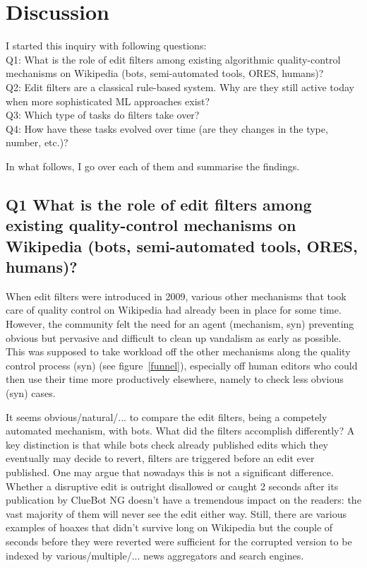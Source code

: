 \chapter{Discussion}
\label{chap:discussion}

I started this inquiry with following questions:\\ %
Q1: What is the role of edit filters among existing algorithmic quality-control mechanisms on Wikipedia (bots, semi-automated tools, ORES, humans)?\\
Q2: Edit filters are a classical rule-based system. Why are they still active today when more sophisticated ML approaches exist?\\
Q3: Which type of tasks do filters take over?\\ %
Q4: How have these tasks evolved over time (are they changes in the type, number, etc.)? %

In what follows, I go over each of them and summarise the findings.

\section{Q1 What is the role of edit filters among existing quality-control mechanisms on Wikipedia (bots, semi-automated tools, ORES, humans)?}

When edit filters were introduced in 2009, various other mechanisms that took care of quality control on Wikipedia had already been in place for some time.
However, the community felt the need for an agent (mechanism, syn) preventing obvious but pervasive and difficult to clean up vandalism as early as possible.
This was supposed to take workload off the other mechanisms along the quality control process (syn) (see figure~\ref{funnel}), especially off human editors who could then use their time more productively elsewhere, namely to check less obvious (syn) cases.

It seems obvious/natural/... to compare the edit filters, being a competely automated mechanism, with bots.
What did the filters accomplish differently?
A key distinction is that while bots check already published edits which they eventually may decide to revert, filters are triggered before an edit ever published.
One may argue that nowadays this is not a significant difference.
Whether a disruptive edit is outright disallowed or caught 2 seconds after its publication by ClueBot NG doesn't have a tremendous impact on the readers:
the vast majority of them will never see the edit either way.
Still, there are various examples of hoaxes that didn't survive long on Wikipedia but the couple of seconds before they were reverted were sufficient for the corrupted version to be indexed by various/multiple/... news aggregators and search engines. %

